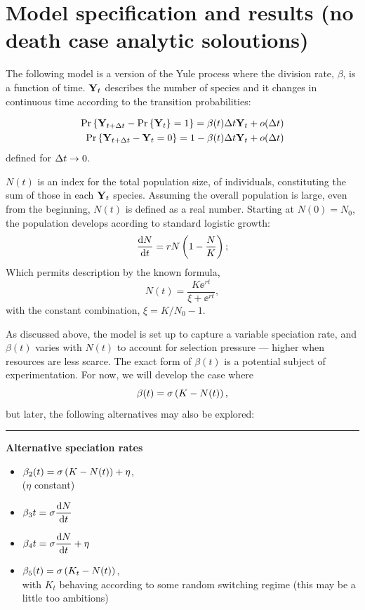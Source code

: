 \section{Model specification and results (no death case analytic soloutions)}

The following model is a version of the Yule process where the division rate, $\beta$, is a function of time. ${{\bf Y}_t}$ describes the number of species and it changes in continuous time according to the transition probabilities:


\begin{align}
\label{cases1}
\begin{split}
{\text{Pr}\left\{{\bf Y}_{t+\Delta t} - {\text{Pr}\left\{{{\bf Y}_t}\right\}} = 1\right\}} = \beta(t)\Delta t{{\bf Y}_t} + o(\Delta t)\\
{\text{Pr}\left\{{\bf Y}_{t+\Delta t} - {{\bf Y}_t} = 0\right\}} = 1 -  \beta(t)\Delta t{{\bf Y}_t} + o(\Delta t)
\end{split}
\end{align}
defined for $\Delta t\to 0$. \par
$N(t)$ is an index for the total population size, of individuals, constituting the sum of those in each ${{\bf Y}_t}$ species. Assuming the overall population is large, even from the beginning, $N(t)$ is defined as a real number. Starting at $N(0) = N_0$, the population develops acording to standard logistic growth: 
$$\displaystyle\frac{{\rm d} N}{{\rm d} t} = rN\left(1 - \frac{N}{K}\right);$$
Which permits description by the known formula, 
$$N(t) = \frac{K\ee^{rt}}{\xi + \ee^{rt}},$$
with the constant combination, $\xi = K/N_0 - 1$.\par
As discussed above, the model is set up to capture a variable speciation rate, and $\beta(t)$ varies with $N(t)$ to account for selection pressure --- higher when resources are less scarce. The exact form of $\beta(t)$ is a potential subject of experimentation. For now, we will  develop the case where
\begin{equation}
\label{basicRate1}
\beta(t) = \sigma\left( K-N(t)\right),
\end{equation}
but later, the following alternatives may also be explored:
\vspace{10pt}
\hrule
\vspace{10pt}
\noindent
\textbf{Alternative speciation rates}
\begin{itemize}
\item $\beta_2(t) = \sigma\left( K-N(t)\right) + \eta$,\\ ($\eta$ constant)
\item $\beta_3{t} = \sigma \displaystyle\frac{{\rm d} N}{{\rm d} t}$
\item $\beta_4{t} = \sigma \displaystyle\frac{{\rm d} N}{{\rm d} t} + \eta$
\item $\beta_5(t) = \sigma\left( K_t-N(t)\right)$,\\ with $K_t$ behaving according to some random switching regime (this may be a little too ambitions)
\end{itemize}
